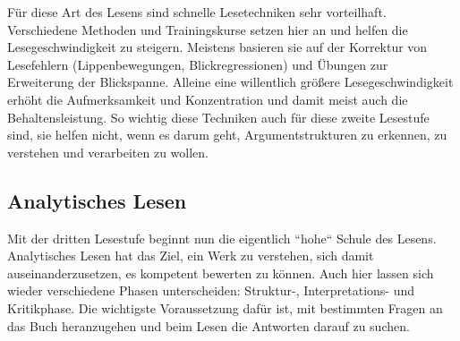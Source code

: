 \documentclass[]{book}
\theoremstyle{definition}
\theoremstyle{definition}
\theoremstyle{definition}
\theoremstyle{remark}
\begin{document}
Für diese Art des Lesens sind schnelle Lesetechniken sehr vorteilhaft.
Verschiedene Methoden und Trainingskurse setzen hier an und helfen die
Lesegeschwindigkeit zu steigern. Meistens basieren sie auf der Korrektur
von Lesefehlern (Lippenbewegungen, Blickregressionen) und Übungen zur
Erweiterung der Blickspanne. Alleine eine willentlich größere
Lesegeschwindigkeit erhöht die Aufmerksamkeit und Konzentration und
damit meist auch die Behaltensleistung. So wichtig diese Techniken auch
für diese zweite Lesestufe sind, sie helfen nicht, wenn es darum geht,
Argumentstrukturen zu erkennen, zu verstehen und verarbeiten zu wollen.

\hypertarget{analytisches-lesen}{\subsection{Analytisches
Lesen}\label{analytisches-lesen}}

Mit der dritten Lesestufe beginnt nun die eigentlich ``hohe`` Schule des
Lesens. Analytisches Lesen hat das Ziel, ein Werk zu verstehen, sich
damit auseinanderzusetzen, es kompetent bewerten zu können. Auch hier
lassen sich wieder verschiedene Phasen unterscheiden: Struktur-,
Interpretations- und Kritikphase. Die wichtigste Voraussetzung dafür
ist, mit bestimmten Fragen an das Buch heranzugehen und beim Lesen die
Antworten darauf zu suchen.
\end{document}
